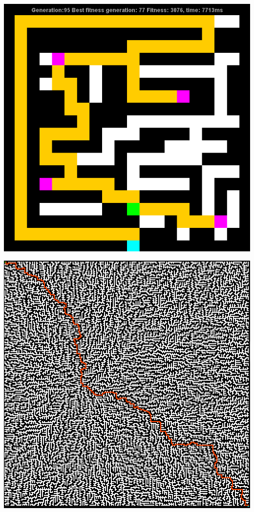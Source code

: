 \documentclass[12pt]{article} %
\begin{document}
\begin{center}
\includegraphics[scale=.6]{maze11}

\includegraphics[scale=.6]{bigMaze}
\end{center}
\end{document}
